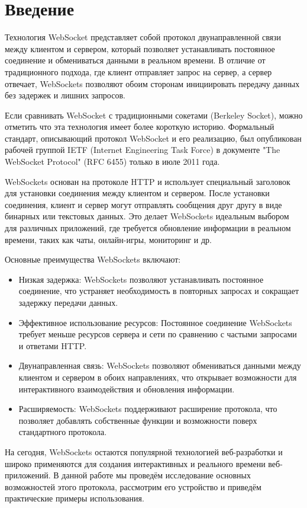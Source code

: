 \chapter*{Введение}

Технология WebSocket представляет собой протокол двунаправленной связи между клиентом и сервером, который позволяет устанавливать постоянное соединение и обмениваться данными в реальном времени. В отличие от традиционного подхода, где клиент отправляет запрос на сервер, а сервер отвечает, WebSockets позволяют обоим сторонам инициировать передачу данных без задержек и лишних запросов.

Если сравнивать WebSocket с традиционными сокетами (Berkeley Socket), можно отметить что эта технология имеет более короткую историю. Формальный стандарт, описывающий протокол WebSocket и его реализацию, был опубликован рабочей группой IETF (Internet Engineering Task Force) в документе "The WebSocket Protocol" (RFC 6455) только в июле 2011 года.

WebSockets основан на протоколе HTTP и использует специальный заголовок для установки соединения между клиентом и сервером. После установки соединения, клиент и сервер могут отправлять сообщения друг другу в виде бинарных или текстовых данных. Это делает WebSockets идеальным выбором для различных приложений, где требуется обновление информации в реальном времени, таких как чаты, онлайн-игры, мониторинг и др.

Основные преимущества WebSockets включают:
\begin{itemize}
\item Низкая задержка: WebSockets позволяют устанавливать постоянное соединение, что устраняет необходимость в повторных запросах и сокращает задержку передачи данных.
\item Эффективное использование ресурсов: Постоянное соединение WebSockets требует меньше ресурсов сервера и сети по сравнению с частыми запросами и ответами HTTP.
\item Двунаправленная связь: WebSockets позволяют обмениваться данными между клиентом и сервером в обоих направлениях, что открывает возможности для интерактивного взаимодействия и обновления информации.
\item Расширяемость: WebSockets поддерживают расширение протокола, что позволяет добавлять собственные функции и возможности поверх стандартного протокола.
\end{itemize}

На сегодня, WebSockets остаются популярной технологией веб-разработки и широко применяются для создания интерактивных и реального времени веб-приложений. В данной работе мы проведём исследование основных возможностей этого протокола, рассмотрим его устройство и приведём практические примеры использования.
